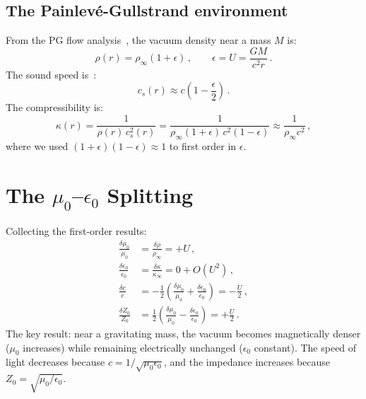 \documentclass[12pt, a4paper]{article}
\begin{document}
\subsection{The Painlev\'{e}-Gullstrand
environment}

From the PG flow
analysis~\cite{kulangiev_gravity,kulangiev_geff},
the vacuum density near a mass $M$ is:
\begin{equation}
    \rho(r) = \rho_\infty(1 + \epsilon)\,,\qquad
    \epsilon = U = \frac{GM}{c^2 r}\,.
\label{eq:rho_PG}
\end{equation}
The sound speed
is~\cite{kulangiev_variable_c}:
\begin{equation}
    c_s(r) \approx c\left(1 - \frac{\epsilon}{2}
    \right)\,.
\label{eq:cs_PG}
\end{equation}
The compressibility is:
\begin{equation}
    \kappa(r) = \frac{1}{\rho(r)\,c_s^2(r)}
    = \frac{1}{\rho_\infty(1+\epsilon)\,
    c^2(1-\epsilon)}
    \approx \frac{1}{\rho_\infty c^2}\,,
\label{eq:kappa_PG}
\end{equation}
where we used $(1+\epsilon)(1-\epsilon) \approx 1$
to first order in $\epsilon$.


\section{The \texorpdfstring{$\mu_0$--$\epsilon_0$}{μ0--ε0} Splitting}
\label{sec:splitting}

Collecting the first-order results:
\begin{align}
    \frac{\delta\mu_0}{\mu_0}
    &= \frac{\delta\rho}{\rho_\infty}
    = +U\,,
\label{eq:dmu}\\
    \frac{\delta\epsilon_0}{\epsilon_0}
    &= \frac{\delta\kappa}{\kappa_\infty}
    = 0 + O(U^2)\,,
\label{eq:deps}\\
    \frac{\delta c}{c}
    &= -\frac{1}{2}\left(
    \frac{\delta\mu_0}{\mu_0}
    + \frac{\delta\epsilon_0}{\epsilon_0}\right)
    = -\frac{U}{2}\,,
\label{eq:dc}\\
    \frac{\delta Z_0}{Z_0}
    &= \frac{1}{2}\left(
    \frac{\delta\mu_0}{\mu_0}
    - \frac{\delta\epsilon_0}{\epsilon_0}\right)
    = +\frac{U}{2}\,.
\label{eq:dZ}
\end{align}
The key result: near a gravitating mass, the vacuum
becomes magnetically denser ($\mu_0$ increases)
while remaining electrically unchanged ($\epsilon_0$
constant). The speed of light decreases because
$c = 1/\sqrt{\mu_0\epsilon_0}$, and the impedance
increases because
$Z_0 = \sqrt{\mu_0/\epsilon_0}$.
\end{document}
